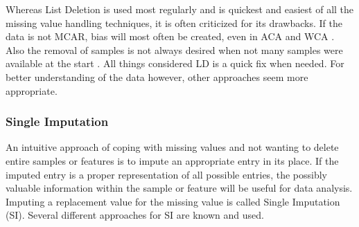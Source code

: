 \documentclass[10pt,a4paper]{report}
\begin{document}
	Whereas List Deletion is used most regularly and is quickest and easiest of all the missing value handling techniques, it is often criticized for its drawbacks. If the data is not MCAR, bias will most often be created, even in ACA and WCA \cite{cartwright2003dealing}. Also the removal of samples is not always desired when not many samples were available at the start \cite{haukoos2007advanced, myrtveit2001analyzing, donders2006gentle}. All things considered LD is a quick fix when needed. For better understanding of the data however, other approaches seem more appropriate.
	
	\subsubsection{Single Imputation}
	\label{MVsubsec:SingleImputation}
	
	An intuitive approach of coping with missing values and not wanting to delete entire samples or features is to impute an appropriate entry in its place. If the imputed entry is a proper representation of all possible entries, the possibly valuable information within the sample or feature will be useful for data analysis. Imputing a replacement value for the missing value is called Single Imputation (SI). Several different approaches for SI are known and used. \cite{haukoos2007advanced, donders2006gentle, myrtveit2001analyzing}
	
\end{document}
